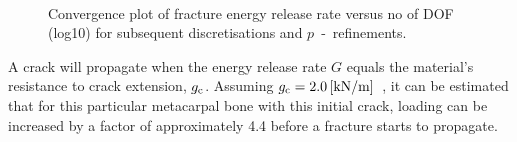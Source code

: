 \documentclass[onecolumn]{svjour3}
\begin{document}
% 	
% 
% 
% 
% 
\begin{figure}[h]
	\centering
	\begin{minipage}{.45\textwidth}
		\def\svgwidth{6.5cm}
		
	\label{fig:bone_ct_mesh_cut}
	\end{minipage}%
	\hspace{0.5cm}
	\begin{minipage}{.45\textwidth}
		\def\svgwidth{6.5cm}
		
		\label{fig:crackfrontforce}
	\end{minipage} \\
	\end{figure}
% 
% 
\begin{figure}[h!]
	\centering
	
	\caption{Convergence plot of fracture energy release rate versus no of DOF (log10) for subsequent discretisations and $p$~-~refinements.}
	\label{fig:max_g1_convergece}
\end{figure}
A crack will propagate when the energy release rate $G$ equals the material's resistance to crack extension, $g_{\rm c}$. Assuming $g_{\rm c} = 2.0\,[\mathrm{ kN/m}]$~\cite{gasser2007numerical}, it can be estimated that for this particular metacarpal bone with this initial crack, loading can be increased by a factor of approximately 4.4 before a fracture starts to propagate. 
% 
% 
% 
\end{document}
